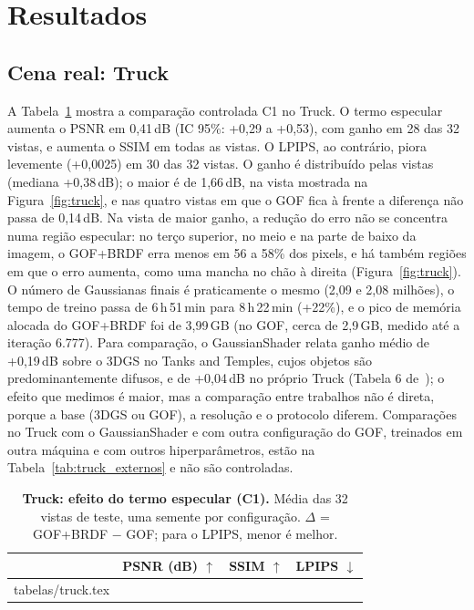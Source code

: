\documentclass[12pt]{article}
\makeatletter
\newcommand{\inputtab}[1]{\@@input #1 } %
\newcommand{\dB}{\,dB}
\makeatother
\begin{document}
\section{Resultados}
\label{sec:resultados}

\subsection{Cena real: Truck}
A Tabela~\ref{tab:truck} mostra a comparação controlada C1 no Truck.
O termo especular aumenta o PSNR em 0,41\dB{} (IC 95\%: +0,29 a +0,53), com ganho em 28 das 32 vistas, e aumenta o SSIM em todas as vistas.
O LPIPS, ao contrário, piora levemente (+0,0025) em 30 das 32 vistas.
O ganho é distribuído pelas vistas (mediana +0,38\dB); o maior é de 1,66\dB, na vista mostrada na Figura~\ref{fig:truck}, e nas quatro vistas em que o GOF fica à frente a diferença não passa de 0,14\dB.
Na vista de maior ganho, a redução do erro não se concentra numa região especular: no terço superior, no meio e na parte de baixo da imagem, o GOF+BRDF erra menos em 56 a 58\% dos pixels, e há também regiões em que o erro aumenta, como uma mancha no chão à direita (Figura~\ref{fig:truck}).
O número de Gaussianas finais é praticamente o mesmo (2,09 e 2,08 milhões), o tempo de treino passa de 6\,h\,51\,min para 8\,h\,22\,min (+22\%), e o pico de memória alocada do GOF+BRDF foi de 3,99\,GB (no GOF, cerca de 2,9\,GB, medido até a iteração 6.777).
Para comparação, o GaussianShader relata ganho médio de +0,19\dB{} sobre o 3DGS no Tanks and Temples, cujos objetos são predominantemente difusos, e de +0,04\dB{} no próprio Truck (Tabela 6 de~\cite{jiang2024gaussianshader}); o efeito que medimos é maior, mas a comparação entre trabalhos não é direta, porque a base (3DGS ou GOF), a resolução e o protocolo diferem.
Comparações no Truck com o GaussianShader e com outra configuração do GOF, treinados em outra máquina e com outros hiperparâmetros, estão na Tabela~\ref{tab:truck_externos} e não são controladas.

\begin{table}[t]
\centering
\caption{\textbf{Truck: efeito do termo especular (C1).} Média das 32 vistas de teste, uma semente por configuração. $\Delta$ = GOF+BRDF $-$ GOF; para o LPIPS, menor é melhor.}
\label{tab:truck}
\footnotesize
\linespread{1.0}\selectfont
\begin{tabular}{lccc}
\toprule
 & PSNR (dB) $\uparrow$ & SSIM $\uparrow$ & LPIPS $\downarrow$ \\
\midrule
\inputtab{tabelas/truck.tex}
\bottomrule
\end{tabular}
\end{table}
\end{document}
